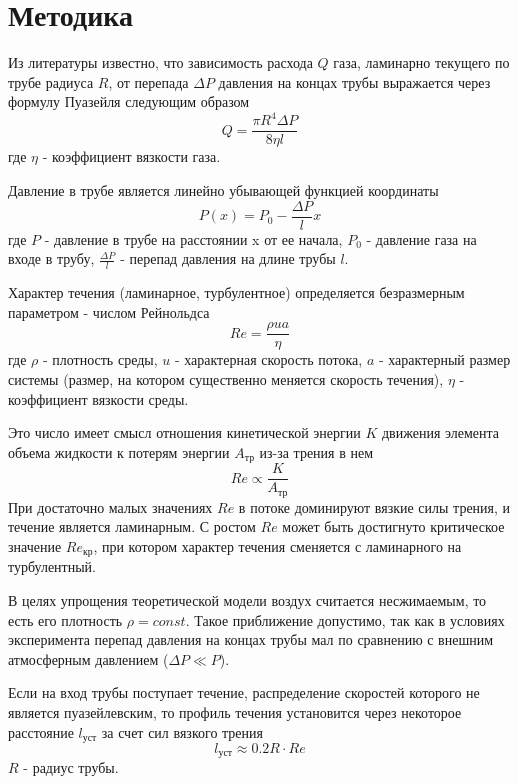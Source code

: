 \section{Методика}
Из литературы \cite{Sivuhin} известно, что зависимость  расхода $Q$ газа, ламинарно текущего по трубе радиуса $R$, от перепада $\Delta P$ давления на концах трубы выражается через формулу Пуазейля следующим образом
\begin{equation}
    Q = \frac{\pi R^4 \Delta P}{8\eta l} \label{eq: Q}
\end{equation}
где $\eta$ - коэффициент вязкости газа.

Давление в трубе является линейно убывающей функцией координаты
\begin{equation}
    P(x) = P_0 - \frac{\Delta P}{l}x \label{eq: P(x)}
\end{equation}
где $P$ - давление в трубе на расстоянии x от ее начала, $P_0$ - давление газа на входе в трубу, $\frac{\Delta P}{l}$ - перепад давления на длине трубы $l$.

Характер течения (ламинарное, турбулентное) определяется безразмерным параметром - числом Рейнольдса
\begin{equation}
    Re = \frac{\rho u a}{\eta} \label{eq: Re}
\end{equation}
где $\rho$ - плотность среды, $u$ - характерная скорость потока, $a$ - характерный размер системы (размер, на котором существенно меняется скорость течения), $\eta$ - коэффициент вязкости среды.

Это число имеет смысл отношения кинетической энергии $K$ движения элемента объема жидкости к потерям энергии $A_\text{тр}$ из-за трения в нем
\begin{equation}
    Re \propto \frac{K}{A_\text{тр}}
\end{equation}
При достаточно малых значениях $Re$ в потоке доминируют вязкие силы трения, и течение является ламинарным. С ростом $Re$ может быть достигнуто критическое значение $Re_\text{кр}$, при котором характер течения сменяется с ламинарного на турбулентный.

В целях упрощения теоретической модели воздух считается несжимаемым, то есть его плотность $\rho = const$. Такое приближение допустимо, так как в условиях эксперимента перепад давления на концах трубы мал по сравнению с внешним атмосферным давлением ($\Delta P \ll P$).

Если на вход трубы поступает течение, распределение скоростей которого не является пуазейлевским, то профиль течения установится через некоторое расстояние $l_\text{уст}$ за счет сил вязкого трения
\begin{equation}
    l_{\text{уст}} \approx 0.2R \cdot Re \label{eq: l_ust}
\end{equation}
$R$ - радиус трубы.


